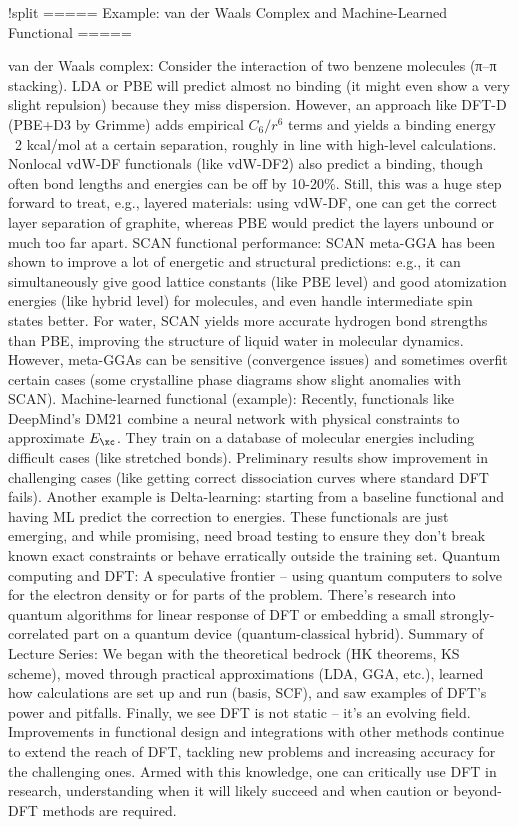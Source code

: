 !split
===== Example: van der Waals Complex and Machine-Learned Functional =====

van der Waals complex: Consider the interaction of two benzene molecules (π–π stacking). LDA or PBE will predict almost no binding (it might even show a very slight repulsion) because they miss dispersion. However, an approach like DFT-D (PBE+D3 by Grimme) adds empirical $C_6/r^6$ terms and yields a binding energy ~2 kcal/mol at a certain separation, roughly in line with high-level calculations. Nonlocal vdW-DF functionals (like vdW-DF2) also predict a binding, though often bond lengths and energies can be off by 10-20$\%$. Still, this was a huge step forward to treat, e.g., layered materials: using vdW-DF, one can get the correct layer separation of graphite, whereas PBE would predict the layers unbound or much too far apart.
SCAN functional performance: SCAN meta-GGA has been shown to improve a lot of energetic and structural predictions: e.g., it can simultaneously give good lattice constants (like PBE level) and good atomization energies (like hybrid level) for molecules, and even handle intermediate spin states better. For water, SCAN yields more accurate hydrogen bond strengths than PBE, improving the structure of liquid water in molecular dynamics. However, meta-GGAs can be sensitive (convergence issues) and sometimes overfit certain cases (some crystalline phase diagrams show slight anomalies with SCAN).
Machine-learned functional (example): Recently, functionals like DeepMind’s DM21 combine a neural network with physical constraints to approximate $E_{\xc}$. They train on a database of molecular energies including difficult cases (like stretched bonds). Preliminary results show improvement in challenging cases (like getting correct dissociation curves where standard DFT fails). Another example is Delta-learning: starting from a baseline functional and having ML predict the correction to energies. These functionals are just emerging, and while promising, need broad testing to ensure they don’t break known exact constraints or behave erratically outside the training set.
Quantum computing and DFT: A speculative frontier – using quantum computers to solve for the electron density or for parts of the problem. There’s research into quantum algorithms for linear response of DFT or embedding a small strongly-correlated part on a quantum device (quantum-classical hybrid).
Summary of Lecture Series: We began with the theoretical bedrock (HK theorems, KS scheme), moved through practical approximations (LDA, GGA, etc.), learned how calculations are set up and run (basis, SCF), and saw examples of DFT’s power and pitfalls. Finally, we see DFT is not static – it’s an evolving field. Improvements in functional design and integrations with other methods continue to extend the reach of DFT, tackling new problems and increasing accuracy for the challenging ones. Armed with this knowledge, one can critically use DFT in research, understanding when it will likely succeed and when caution or beyond-DFT methods are required. 



